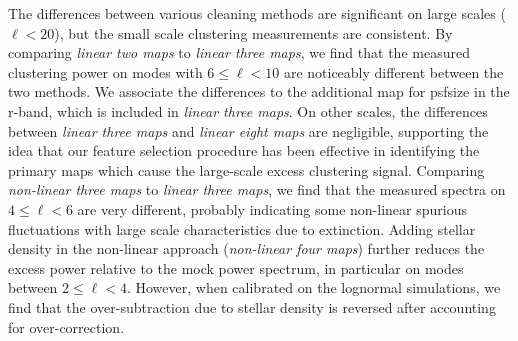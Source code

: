 The differences between various cleaning methods are significant on large scales ($\ell < 20$), but the small scale clustering measurements are consistent. By comparing \textit{linear two maps} to \textit{linear three maps}, we find that the measured clustering power on modes with $6\leq \ell < 10$ are noticeably different between the two methods. We associate the differences to the additional map for psfsize in the r-band, which is included in \textit{linear three maps}. On other scales, the differences between \textit{linear three maps} and \textit{linear eight maps} are negligible, supporting the idea that our feature selection procedure has been effective in identifying the primary maps which cause the large-scale excess clustering signal. Comparing \textit{non-linear three maps} to \textit{linear three maps}, we find that the measured spectra on $4 \leq \ell < 6$ are very different, probably indicating some non-linear spurious fluctuations with large scale characteristics due to extinction. Adding stellar density in the non-linear approach (\textit{non-linear four maps}) further reduces the excess power relative to the mock power spectrum, in particular on modes between $2\leq \ell < 4$. However, when calibrated on the lognormal simulations, we find that the over-subtraction due to stellar density is reversed after accounting for over-correction.


